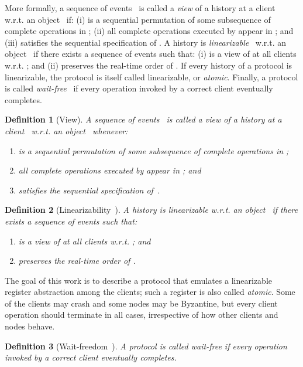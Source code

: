 \documentclass[oribibl]{llncs}
\theoremstyle{definition-boldhead}
\newtheorem{definition}{Definition}
\newcommand{\nodes}{nodes\xspace}
\begin{document}
\if\submit\yes
 More formally, a sequence of events~ is called a \emph{view} of a history  at a client~ w.r.t. an object~ if: (i)  is a sequential permutation of some subsequence of complete operations in ; (ii) all complete operations executed by  appear in ; and (iii)  satisfies the sequential specification of . A history  is \emph{linearizable}~\cite{herwin90} w.r.t. an object~ if
  there exists a sequence of events  such that: (i)  is a view of  at all clients w.r.t. ; and (ii)  preserves the real-time order of . If every history of a protocol is  linearizable, the protocol is itself called linearizable, or \emph{atomic}. Finally, a protocol is called \emph{wait-free}~\cite{herlih91} if every operation invoked by a correct client eventually completes.
\else

\begin{definition}[View]
  A sequence of events~ is called a \emph{view} of a history
   at a client~ w.r.t. an object~ whenever:
\begin{enumerate}
\item  is a sequential permutation of some subsequence
of complete operations in ;
\item all complete operations executed by  appear in ; and
\item  satisfies the sequential specification of~.
\end{enumerate}
\end{definition}

\begin{definition}[Linearizability~\cite{herwin90}]
  A history  is linearizable w.r.t. an object~ if
  there exists a sequence of events  such that:
\begin{enumerate}
\item  is a view of  at all clients w.r.t. ; and
\item  preserves the real-time order of .
\end{enumerate}
\end{definition}

The goal of this work is to describe a protocol that emulates a
linearizable register abstraction among the clients; such a register
is also called \emph{atomic}.  Some of the clients may crash and some
\nodes may be Byzantine, but every client operation should terminate
in all cases, irrespective of how other clients and \nodes behave.

\begin{definition}[Wait-freedom~\cite{herlih91}]
  A protocol is called \emph{wait-free} if every operation invoked by
  a correct client eventually completes.
\end{definition}
\fi
\end{document}
